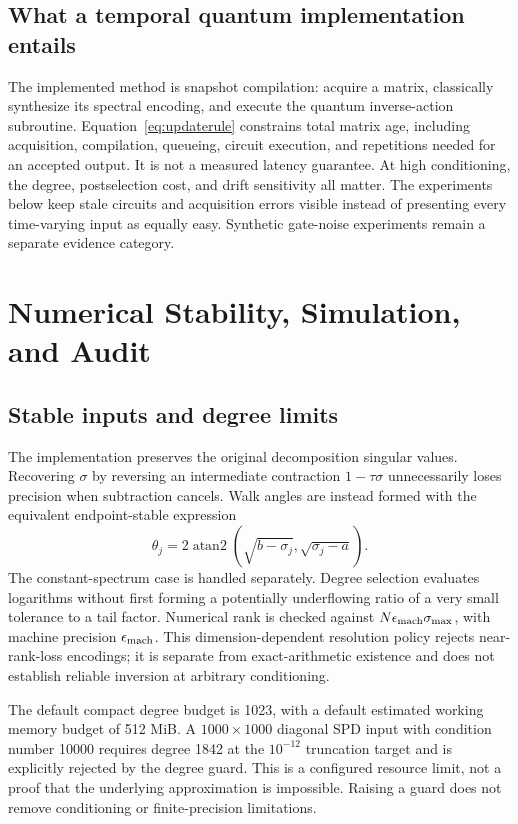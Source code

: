 \documentclass[journal]{IEEEtran}
\begin{document}
\subsection{What a temporal quantum implementation entails}
The implemented method is snapshot compilation: acquire a matrix,
classically synthesize its spectral encoding, and execute the quantum
inverse-action subroutine. Equation~\eqref{eq:updaterule} constrains total
matrix age, including acquisition, compilation, queueing, circuit execution,
and repetitions needed for an accepted output. It is not a measured
latency guarantee. At high conditioning, the degree, postselection cost,
and drift sensitivity all matter. The experiments below keep stale
circuits and acquisition errors visible instead of presenting every
time-varying input as equally easy. Synthetic gate-noise experiments
remain a separate evidence category.

\section{Numerical Stability, Simulation, and Audit}
\subsection{Stable inputs and degree limits}
The implementation preserves the original decomposition singular values.
Recovering $\sigma$ by reversing an intermediate contraction
$1-\tau\sigma$ unnecessarily loses precision when subtraction cancels.
Walk angles are instead formed with the equivalent endpoint-stable expression
\begin{equation}
 \theta_j=2\operatorname{atan2}
       \left(\sqrt{b-\sigma_j},\sqrt{\sigma_j-a}\right).
 \label{eq:stableangle}
\end{equation}
The constant-spectrum case is handled separately. Degree selection evaluates
logarithms without first forming a potentially underflowing ratio of a very
small tolerance to a tail factor. Numerical rank is checked against
$N\epsilon_{\rm mach}\sigma_{\max}$, with machine precision
$\epsilon_{\rm mach}$. This dimension-dependent resolution policy
rejects near-rank-loss encodings; it is separate from exact-arithmetic
existence and does not establish reliable inversion at arbitrary conditioning.

The default compact degree budget is 1023, with a default estimated working
memory budget of 512 MiB. A $1000\times1000$ diagonal SPD input with condition
number 10000 requires degree 1842 at the $10^{-12}$ truncation target and is
explicitly rejected by the degree guard. This is a configured resource limit,
not a proof that the underlying approximation is impossible. Raising a guard
does not remove conditioning or finite-precision limitations.
\end{document}
